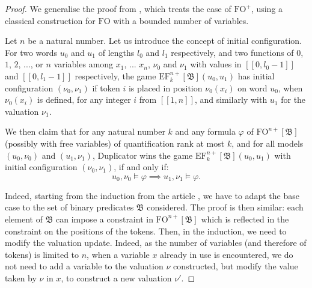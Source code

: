 \documentclass[a4paper,UKenglish,cleveref, autoref, thm-restate]{lipics-v2021}
\newcommand{\FO}{\mathrm{FO}}
\newcommand{\FOp}{\FO^+}
\newcommand{\EF}{\mathrm{EF}}
\newcommand{\val}{\nu}
\newcommand{\bin}{\mathfrak{B}}
\begin{document}
\begin{proof}
    We generalise the proof from \cite[Theorem 5.7]{PFO}, which treats the case of $\FOp$, using a classical construction for $\FO$ with a bounded number of variables.

    Let $n$ be a natural number.
    Let us introduce the concept of initial configuration. For two words $u_0$ and $u_1$ of lengths $l_0$ and $l_1$ respectively, and two functions of $0$, $1$, $2$, ..., or $n$ variables among $x_1$, ... $x_n$, $\val_0$ and $\val_1$ with values in $[\![0,l_0-1]\!]$ and $[\![0,l_1-1]\! ]$ respectively, the game $\EF_k^{n+}[\bin](u_0,u_1)$ has initial configuration $(\val_0,\val_1)$ if token $i$ is placed in position $\val_0(x_i)$ on word $u_0$, when $\val_0(x_i)$ is defined, for any integer $i$ from $[\! [1,n]\!]$, and similarly with $u_1$ for the valuation $\val_1$.

    We then claim that for any natural number $k$ and any formula $\varphi$ of $\FO^{n+}[\bin]$ (possibly with free variables) of quantification rank at most $k$, and for all models $(u_0,\val_0)$ and $(u_1,\val_1)$, Duplicator wins the game $\EF_k^{n+}[\bin](u_0,u_1)$ with initial configuration $(\val_0,\val_1)$, if and only if:
    $$
        u_0,\val_0 \models \varphi \implies u_1,\val_1 \models \varphi.
    $$

    Indeed, starting from the induction from the article \cite{PFO}, we have to adapt the base case to the set of binary predicates $\bin$ considered. The proof is then similar: each element of $\bin$ can impose a constraint in $\FO^{n+}[\bin]$ which is reflected in the constraint on the positions of the tokens. Then, in the induction, we need to modify the valuation update. Indeed, as the number of variables (and therefore of tokens) is limited to $n$, when a variable $x$ already in use is encountered, we do not need to add a variable to the valuation $\val$ constructed, but modify the value taken by $\val$ in $x$, to construct a new valuation $\val'$.
    

    
    
    
\end{proof}
\end{document}
